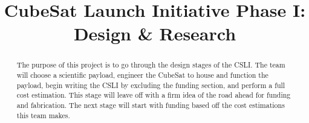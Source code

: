 \documentclass[conference]{IEEEtran} %
\title{CubeSat Launch Initiative Phase I\@: \newline Design \& Research}
\author{
  \IEEEauthorblockN{%
    James~Parkus\IEEEauthorrefmark{1},  %
    Austin~Bodzas\IEEEauthorrefmark{2}
  }
  \IEEEauthorblockA{%
    RIT Space Exploration, Rochester Institute of Technology \\ %
    Rochester, N.Y. \\
    Email:
    \IEEEauthorrefmark{1}jep7631@rit.edu,
    \IEEEauthorrefmark{2}abb6499@rit.edu
  }

}
\begin{document}
\maketitle%

\begin{abstract}
The purpose of this project is to go through the design stages of the CSLI\@. The team will choose a scientific payload, engineer the CubeSat to house and function
the payload, begin writing the CSLI by excluding the funding section, and perform a full cost estimation. This stage will leave off with a firm idea of the road ahead for funding and fabrication. The next stage will start with
funding based off the cost estimations this team makes.

\end{abstract}

\label{sec:nomenclature}
\newcommand{\nomunit}[1]{%
\renewcommand{\nomentryend}{\hspace*{\fill}#1}}
\renewcommand{\nompreamble}{

  }
\end{document}
